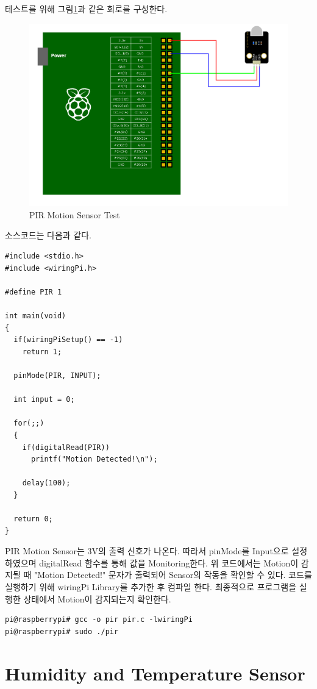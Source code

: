\documentclass[11pt
  , a4paper
  , article
  , oneside
]{memoir}
\begin{document}
테스트를 위해 그림\ref{fig:pir_test}과 같은 회로를 구성한다.
\begin{figure}[!htb]
\centering
\includegraphics[width=1\textwidth]{./images/raspberry/pir_test.png}
\caption{PIR Motion Sensor Test}
\label{fig:pir_test}
\end{figure}
소스코드는 다음과 같다.
\begin{lstlisting}[style=termstylenumber, caption={pri.c}, label={list:priTestCode}]
#include <stdio.h>
#include <wiringPi.h>

#define PIR 1

int main(void)
{
  if(wiringPiSetup() == -1)
    return 1;

  pinMode(PIR, INPUT);

  int input = 0;

  for(;;)
  {
    if(digitalRead(PIR))
      printf("Motion Detected!\n");

    delay(100);
  }

  return 0;
}
\end{lstlisting}
PIR Motion Sensor는 3V의 출력 신호가 나온다. 따라서 pinMode를 Input으로 설정하였으며 digitalRead 함수를
통해 값을 Monitoring한다. 위 코드에서는 Motion이 감지될 때 "Motion Detected!" 문자가 출력되어 Sensor의
작동을 확인할 수 있다. 
코드를 실행하기 위해 wiringPi Library를 추가한 후 컴파일 한다. 최종적으로 프로그램을 실행한 상태에서
Motion이 감지되는지 확인한다.
\begin{lstlisting}[style=termstyle]
pi@raspberrypi# gcc -o pir pir.c -lwiringPi
pi@raspberrypi# sudo ./pir
\end{lstlisting}
\section{Humidity and Temperature Sensor}
\end{document}
